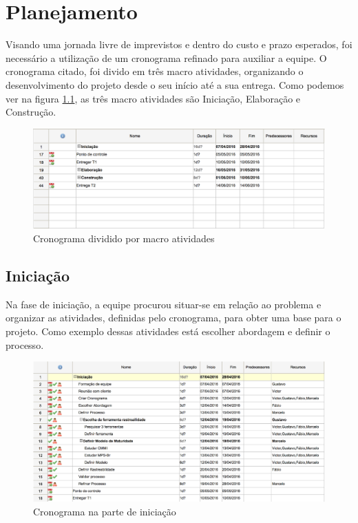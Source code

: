 \chapter{Planejamento}
\label{planning}

Visando uma jornada livre de imprevistos e dentro do custo e prazo esperados, foi necessário a utilização de um cronograma refinado para auxiliar a equipe. O cronograma citado, foi divido em três macro atividades, organizando o desenvolvimento do projeto desde o seu início até a sua entrega. Como podemos ver na figura \ref{schedule}, as três macro atividades são Iniciação, Elaboração e Construção.

\begin{figure}[htb]
\centering
  \includegraphics[keepaspectratio=true,scale=0.5]
  {figuras/cronograma_macro.eps}
  \caption{Cronograma dividido por macro atividades}
  \label{schedule}
\end{figure}

\clearpage{}

\section{Iniciação}

Na fase de iniciação, a equipe procurou situar-se em relação ao problema e organizar as atividades, definidas pelo cronograma, para obter uma base para o projeto. Como exemplo dessas atividades está escolher abordagem e definir o processo.

\begin{figure}[htb]
\centering
  \includegraphics[keepaspectratio=true,scale=0.5]
  {figuras/cronograma_iniciacao.eps}
  \caption{Cronograma na parte de iniciação}
  \label{schedule-init}
\end{figure}

